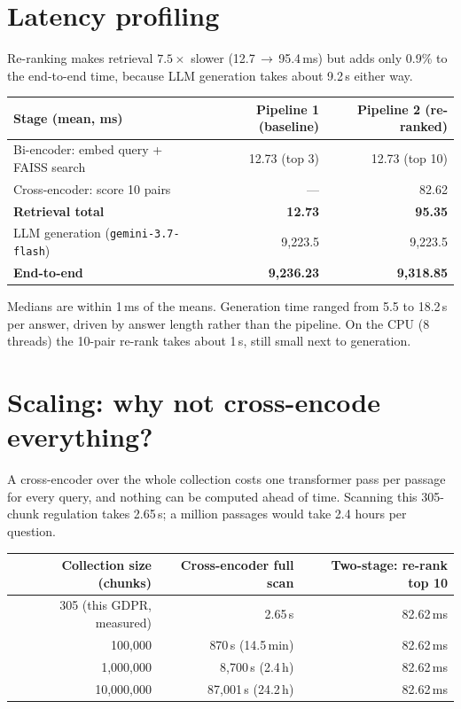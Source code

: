 \documentclass[10pt,a4paper]{article}
\begin{document}
\section{Latency profiling}

Re-ranking makes retrieval $7.5\times$ slower (12.7\,$\rightarrow$\,95.4\,ms) but adds only 0.9\% to the
end-to-end time, because LLM generation takes about 9.2\,s either way.

\begin{table}[!htbp]
\centering\small
\begin{tabular}{@{}lrr@{}}
\toprule
\textbf{Stage (mean, ms)} & \textbf{Pipeline 1 (baseline)} & \textbf{Pipeline 2 (re-ranked)} \\
\midrule
Bi-encoder: embed query + FAISS search & 12.73 (top 3) & 12.73 (top 10) \\
Cross-encoder: score 10 pairs & --- & 82.62 \\
\textbf{Retrieval total} & \textbf{12.73} & \textbf{95.35} \\
LLM generation (\texttt{gemini-3.7-flash}) & 9,223.5 & 9,223.5 \\
\textbf{End-to-end} & \textbf{9,236.23} & \textbf{9,318.85} \\
\bottomrule
\end{tabular}
\end{table}

Medians are within 1\,ms of the means. Generation time ranged from 5.5 to 18.2\,s per answer, driven by answer
length rather than the pipeline. On the CPU (8 threads) the 10-pair re-rank takes about 1\,s, still small next to
generation.

\section{Scaling: why not cross-encode everything?}

A cross-encoder over the whole collection costs one transformer pass per passage for every query, and nothing can
be computed ahead of time. Scanning this 305-chunk regulation takes 2.65\,s; a million passages would take 2.4
hours per question.

\begin{table}[!htbp]
\centering\small
\begin{tabular}{@{}rrr@{}}
\toprule
\textbf{Collection size (chunks)} & \textbf{Cross-encoder full scan} & \textbf{Two-stage: re-rank top 10} \\
\midrule
305 (this GDPR, measured) & 2.65\,s & 82.62\,ms \\
100,000 & 870\,s (14.5\,min) & 82.62\,ms \\
1,000,000 & 8,700\,s (2.4\,h) & 82.62\,ms \\
10,000,000 & 87,001\,s (24.2\,h) & 82.62\,ms \\
\bottomrule
\end{tabular}
\end{table}
\end{document}
